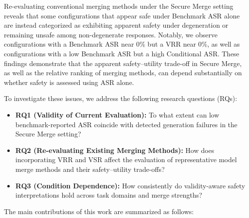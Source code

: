 \documentclass{article}
\begin{document}
Re-evaluating conventional merging methods under the Secure Merge setting reveals that some configurations that appear safe under Benchmark ASR alone are instead categorized as exhibiting apparent safety under degeneration or remaining unsafe among non-degenerate responses. Notably, we observe configurations with a Benchmark ASR near 0\% but a VRR near 0\%, as well as configurations with a low Benchmark ASR but a high Conditional ASR. These findings demonstrate that the apparent safety--utility trade-off in Secure Merge, as well as the relative ranking of merging methods, can depend substantially on whether safety is assessed using ASR alone.

To investigate these issues, we address the following research questions (RQs):

\begin{itemize}
    \item \textbf{RQ1 (Validity of Current Evaluation):} To what extent can low benchmark-reported ASR coincide with detected generation failures in the Secure Merge setting?
    
    \item \textbf{RQ2 (Re-evaluating Existing Merging Methods):} How does incorporating VRR and VSR affect the evaluation of representative model merge methods and their safety--utility trade-offs?
    
    \item \textbf{RQ3 (Condition Dependence):} How consistently do validity-aware safety interpretations hold across task domains and merge strengths?
\end{itemize}

The main contributions of this work are summarized as follows:
\end{document}

